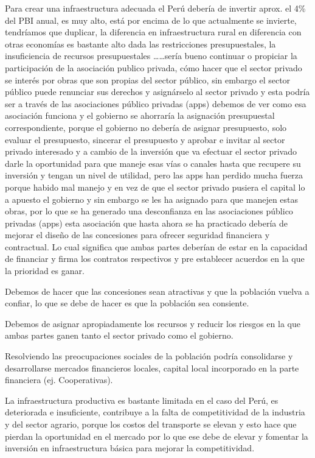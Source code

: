 \documentclass[
  jou,
  floatsintext,
  longtable,
  a4paper,
  nolmodern,
  notxfonts,
  notimes,
  12pt,
  colorlinks=true,linkcolor=blue,citecolor=blue,urlcolor=blue]{apa7}
\begin{document}
Para crear una infraestructura adecuada el Perú debería de invertir
aprox. el 4\% del PBI anual, es muy alto, está por encima de lo que
actualmente se invierte, tendríamos que duplicar, la diferencia en
infraestructura rural en diferencia con otras economías es bastante alto
dada las restricciones presupuestales, la insuficiencia de recursos
presupuestales \ldots\ldots sería bueno continuar o propiciar la
participación de la asociación publico privada, cómo hacer que el sector
privado se interés por obras que son propias del sector público, sin
embargo el sector público puede renunciar sus derechos y asignárselo al
sector privado y esta podría ser a través de las asociaciones público
privadas (apps) debemos de ver como esa asociación funciona y el
gobierno se ahorraría la asignación presupuestal correspondiente, porque
el gobierno no debería de asignar presupuesto, solo evaluar el
presupuesto, sincerar el presupuesto y aprobar e invitar al sector
privado interesado y a cambio de la inversión que va efectuar el sector
privado darle la oportunidad para que maneje esas vías o canales hasta
que recupere su inversión y tengan un nivel de utilidad, pero las apps
han perdido mucha fuerza porque habido mal manejo y en vez de que el
sector privado pusiera el capital lo a apuesto el gobierno y sin embargo
se les ha asignado para que manejen estas obras, por lo que se ha
generado una desconfianza en las asociaciones público privadas (apps)
esta asociación que hasta ahora se ha practicado debería de mejorar el
diseño de las concesiones para ofrecer seguridad financiera y
contractual. Lo cual significa que ambas partes deberían de estar en la
capacidad de financiar y firma los contratos respectivos y pre
establecer acuerdos en la que la prioridad es ganar.

Debemos de hacer que las concesiones sean atractivas y que la población
vuelva a confiar, lo que se debe de hacer es que la población sea
consiente.

Debemos de asignar apropiadamente los recursos y reducir los riesgos en
la que ambas partes ganen tanto el sector privado como el gobierno.

Resolviendo las preocupaciones sociales de la población podría
consolidarse y desarrollarse mercados financieros locales, capital local
incorporado en la parte financiera (ej. Cooperativas).

La infraestructura productiva es bastante limitada en el caso del Perú,
es deteriorada e insuficiente, contribuye a la falta de competitividad
de la industria y del sector agrario, porque los costos del transporte
se elevan y esto hace que pierdan la oportunidad en el mercado por lo
que ese debe de elevar y fomentar la inversión en infraestructura básica
para mejorar la competitividad.
\end{document}
